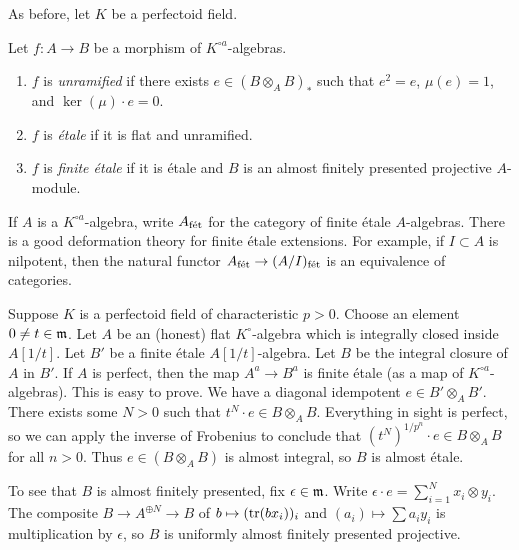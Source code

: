 \documentclass{article}
\begin{document}
As before, let $K$ be a perfectoid field. 

\begin{definition}
Let $f:A\to B$ be a morphism of $K^{\circ a}$-algebras. 
\begin{enumerate}
  \item $f$ is \emph{unramified} if there exists $e\in (B\otimes_A B)_\ast$ 
    such that $e^2=e$, $\mu(e)=1$, and $\ker(\mu)\cdot e=0$. 
  \item $f$ is \emph{\'etale} if it is flat and unramified. 
  \item $f$ is \emph{finite \'etale} if it is \'etale and $B$ is an almost finitely 
presented projective $A$-module. 
\end{enumerate}
\end{definition}

If $A$ is a $K^{\circ a}$-algebra, write $A_{\textnormal{f\'et}}$ for the category of finite 
\'etale $A$-algebras. There is a good deformation theory for finite \'etale 
extensions. For example, if $I\subset A$ is nilpotent, then the natural functor 
$A_{\textnormal{f\'et}} \to (A/I)_{\textnormal{f\'et}}$ is an equivalence of categories. 

Suppose $K$ is a perfectoid field of characteristic $p>0$. Choose an element 
$0\ne t\in\mathfrak{m}$. Let $A$ be an (honest) flat $K^\circ$-algebra which is integrally 
closed inside $A[1/t]$. Let $B'$ be a finite \'etale $A[1/t]$-algebra. Let $B$ 
be the integral closure of $A$ in $B'$. If $A$ is perfect, then the map 
$A^a \to B^a$ is finite \'etale (as a map of $K^{\circ a}$-algebras). This is easy 
to prove. We have a diagonal idempotent $e\in B'\otimes_A B'$. There exists 
some $N>0$ such that $t^N\cdot e\in B\otimes_A B$. Everything in sight is 
perfect, so we can apply the inverse of Frobenius to conclude that 
$(t^N)^{1/p^n}\cdot e\in B\otimes_A B$ for all $n>0$. Thus  
$e\in (B\otimes_A B)$ is almost integral, so $B$ is almost \'etale. 

To see that $B$ is almost finitely presented, fix $\epsilon\in\mathfrak{m}$. Write 
$\epsilon\cdot e = \sum_{i=1}^N x_i\otimes y_i$. The composite 
$B\to A^{\oplus N} \to B$ of $b\mapsto (\operatorname{tr}(b x_i))_i$ and 
$(a_i)\mapsto \sum a_i y_i$ is multiplication by $\epsilon$, so $B$ is uniformly almost 
finitely presented projective. 







\end{document}

